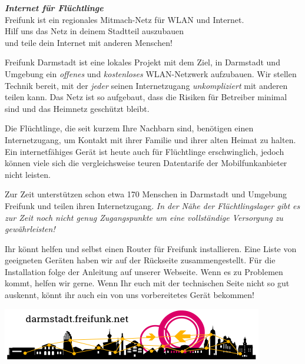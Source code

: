 \documentclass[a4paper]{article}
\begin{document}
\thispagestyle{empty}
 
\begin{center}
\Huge \textit{\textbf{\textcolor{freifunkpink}{Internet für Flüchtlinge}}} \\
\vspace{0.6cm}
\large Freifunk ist ein regionales Mitmach-Netz für WLAN und Internet.\\
Hilf uns das Netz in deinem Stadtteil auszubauen \\
und teile dein Internet mit anderen Menschen!
\normalsize

\vspace{1.0cm}
\end{center}

{ }
\vspace{0.5cm}

Freifunk Darmstadt ist eine lokales Projekt mit dem Ziel, in Darmstadt und Umgebung ein \emph{offenes} und \emph{kostenloses} WLAN-Netzwerk aufzubauen. Wir stellen Technik bereit, mit der \emph{jeder} seinen Internetzugang \emph{unkompliziert} mit anderen teilen kann. Das Netz ist so aufgebaut, dass die Risiken für Betreiber minimal sind und das Heimnetz geschützt bleibt.

Die Flüchtlinge, die seit kurzem Ihre Nachbarn sind, benötigen einen Internetzugang, um Kontakt mit ihrer Familie und ihrer alten Heimat zu halten. Ein internetfähiges Gerät ist heute auch für Flüchtlinge erschwinglich, jedoch können viele sich die vergleichsweise teuren Datentarife der Mobilfunkanbieter nicht leisten.

Zur Zeit unterstützen schon etwa 170 Menschen in Darmstadt und Umgebung Freifunk und teilen ihren Internetzugang. \emph{In der Nähe der Flüchtlingslager gibt es zur Zeit noch nicht genug Zugangspunkte um eine vollständige Versorgung zu gewährleisten!}

Ihr könnt helfen und selbst einen Router für Freifunk installieren. Eine Liste von geeigneten Geräten haben wir auf der Rückseite zusammengestellt. Für die Installation folge der Anleitung auf unserer Webseite. Wenn es zu Problemen kommt, helfen wir gerne.
Wenn Ihr euch mit der technischen Seite nicht so gut auskennt, könnt ihr auch ein von uns vorbereitetes Gerät bekommen!

\vspace{0.6cm}

\begin{center}
\includegraphics[width=\textwidth]{logo}
\end{center}
\end{document}
